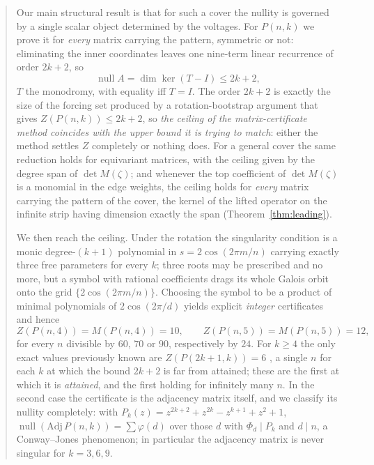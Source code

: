 \documentclass[11pt]{article}
\theoremstyle{definition}
\begin{document}
\begin{abstract}
Our main structural result is that for such a cover the nullity is governed by
a single scalar object determined by the voltages. For $P(n,k)$ we prove it for
\emph{every} matrix carrying the pattern, symmetric or not: eliminating the
inner coordinates leaves one nine-term linear recurrence of order $2k+2$, so
\[
  \operatorname{null}A=\dim\ker(T-I)\le 2k+2,
\]
$T$ the monodromy, with equality iff $T=I$. The order $2k+2$ is exactly the
size of the forcing set produced by a rotation-bootstrap argument that gives
$Z(P(n,k))\le2k+2$, so \emph{the ceiling of the matrix-certificate method
coincides with the upper bound it is trying to match}: either the method settles
$Z$ completely or nothing does. For a general cover the same reduction holds for
equivariant matrices, with the ceiling given by the degree span of
$\det M(\zeta)$; and whenever the top coefficient of $\det M(\zeta)$ is a
monomial in the edge weights, the ceiling holds for \emph{every} matrix carrying
the pattern of the cover, the kernel of the lifted operator on the infinite
strip having dimension exactly the span (Theorem~\ref{thm:leading}).

We then reach the ceiling. Under the rotation the singularity condition is a
monic degree-$(k+1)$ polynomial in $s=2\cos(2\pi m/n)$ carrying exactly three
free parameters for every $k$; three roots may be prescribed and no more, but a
symbol with rational coefficients drags its whole Galois orbit onto the grid
$\{2\cos(2\pi m/n)\}$. Choosing the symbol to be a product of minimal
polynomials of $2\cos(2\pi/d)$ yields explicit \emph{integer} certificates and
hence
\[
  Z(P(n,4))=M(P(n,4))=10,\qquad Z(P(n,5))=M(P(n,5))=12,
\]
for every $n$ divisible by $60$, $70$ or $90$, respectively by $24$. For
$k\ge4$ the only exact values previously known are $Z(P(2k+1,k))=6$
\cite[Thm.~2.6]{RST}, a single $n$ for each $k$ at which the bound $2k+2$ is far
from attained; these are the first at which it is \emph{attained}, and the first
holding for infinitely many $n$. In the second case the certificate is the adjacency matrix
itself, and we classify its nullity completely: with
$P_k(z)=z^{2k+2}+z^{2k}-z^{k+1}+z^2+1$,
$\operatorname{null}(\mathrm{Adj}\,P(n,k))=\sum\varphi(d)$ over those $d$ with
$\Phi_d\mid P_k$ and $d\mid n$, a Conway--Jones phenomenon; in particular the
adjacency matrix is never singular for $k=3,6,9$.


\end{abstract}
\end{document}
